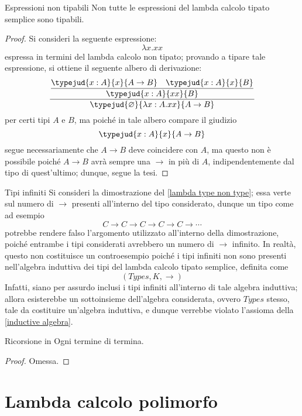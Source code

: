 \documentclass[a4paper, 12pt]{report}
\begin{document}
    \begin{framedlem}[label={lambda type non type}]{Espressioni non tipabili}
        Non tutte le espressioni del lambda calcolo tipato semplice sono tipabili.
    \end{framedlem}

    \begin{proof}
        Si consideri la seguente espressione: $$\lambda x. xx$$ espressa in termini del lambda calcolo non tipato; provando a tipare tale espressione, si ottiene il seguente albero di derivazione: $$\dfrac{\dfrac{\typejud{x:A}{x}{A \to B} \quad \typejud{x:A}{x}{B}}{\typejud{x:A}{xx}{B}}}{\typejud{\varnothing}{\lambda x: A .xx}{A \to B}}$$ per certi tipi $A$ e $B$, ma poiché in tale albero compare il giudizio $$\typejud{x:A}{x}{A \to B}$$ segue necessariamente che $A \to B$ deve coincidere con $A$, ma questo non è possibile poiché $A \to B$ avrà sempre una $\to$ in più di $A$, indipendentemente dal tipo di quest'ultimo; dunque, segue la tesi.
    \end{proof}

    \begin{framedobs}{Tipi infiniti}
        Si consideri la dimostrazione del \cref{lambda type non type}; essa verte sul numero di $\to$ presenti all'interno del tipo considerato, dunque un tipo  come ad esempio $$C \to C \to C \to C \to C \to \cdots$$ potrebbe rendere falso l'argomento utilizzato all'interno della dimostrazione, poiché entrambe i tipi considerati avrebbero un numero di $\to$ infinito. In realtà, questo non costituisce un controesempio poiché i tipi infiniti non sono presenti nell'algebra induttiva dei tipi del lambda calcolo tipato semplice, definita come $$(Types, K, \to)$$ Infatti, siano per assurdo inclusi i tipi infiniti all'interno di tale algebra induttiva; allora esisterebbe un sottoinsieme dell'algebra considerata, ovvero $Types$ stesso, tale da costituire un'algebra induttiva, e dunque verrebbe violato l'assioma  della \cref{inductive algebra}.
    \end{framedobs}

    \begin{framedprop}{Ricorsione in }
        Ogni termine di  termina.
    \end{framedprop}

    \begin{proof}
        Omessa.
    \end{proof}

    \section{Lambda calcolo polimorfo}
    
\end{document}
